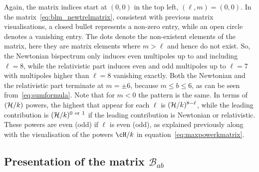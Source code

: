 \ee
Again, the matrix indices start at \((0,0)\) in the top left, \((\ell,m) = (0,0)\). In the matrix~\eqref{eq:blm_newtrelmatrix}, consistent with previous matrix visualisations, a closed bullet represents a non-zero entry, while an open circle denotes a vanishing entry. The dots denote the non-existent elements of the matrix, here they are matrix elements where \(m > \ell\) and hence do not exist.
So, the Newtonian bispectrum only induces even multipoles up to and including \(\ell=8\), while the relativistic part induces even and odd multipoles up to $\ell=7$ with multipoles higher than \(\ell = 8\) vanishing exactly. Both the Newtonian and the relativistic part terminate at $m=\pm6$, because $m\leq b\leq6$, as can  be seen from~\eqref{eq:sumformula}. Note that for $m<0$ the pattern is the same.	
In terms of $({\cal H}/k)$ powers, the highest that appear for each $\ell$ is $({\cal H}/k)^{8-\ell}$, while the leading contribution is $({\cal H}/k)^{0~\text{or}~1}$ if the leading contribution is Newtonian or relativistic. These powers are even (odd) if $\ell$ is even (odd), as explained previously along with the visualisation of the powers \(\cH/k\) in equation~\eqref{eq:maxpowerkmatrix}.






\subsection{Presentation of the matrix $\mathcal{B}_{ab}$}

